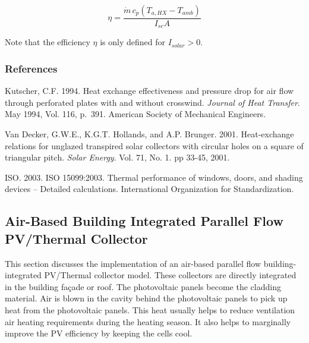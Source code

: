 \begin{equation}
\eta  = \frac{{\dot m\,{c_p}\left( {{T_{a,HX}} - {T_{amb}}} \right)}}{{{I_{sc}}A}}
\end{equation}

Note that the efficiency \(\eta\) is only defined for \({I_{solar}} > 0\).

\subsubsection{References}\label{references-3-004}

Kutscher, C.F. 1994. Heat exchange effectiveness and pressure drop for air flow through perforated plates with and without crosswind. \emph{Journal of Heat Transfer}. May 1994, Vol. 116, p.~391. American Society of Mechanical Engineers.

Van Decker, G.W.E., K.G.T. Hollands, and A.P. Brunger. 2001. Heat-exchange relations for unglazed transpired solar collectors with circular holes on a square of triangular pitch. \emph{Solar Energy}. Vol. 71, No. 1. pp 33-45, 2001.

ISO. 2003. ISO 15099:2003. Thermal performance of windows, doors, and shading devices -- Detailed calculations. International Organization for Standardization.

\subsection{Air-Based Building Integrated Parallel Flow PV/Thermal Collector}\label{building-integrated-pv-thermal-collector}
This section discusses the implementation of an air-based parallel flow building-integrated PV/Thermal collector model. These collectors are directly integrated in the building fa\c{c}ade or roof. The photovoltaic panels become the cladding material. Air is blown in the cavity behind the photovoltaic panels to pick up heat from the photovoltaic panels. This heat usually helps to reduce ventilation air heating requirements during the heating season. It also helps to marginally improve the PV efficiency by keeping the cells cool.

